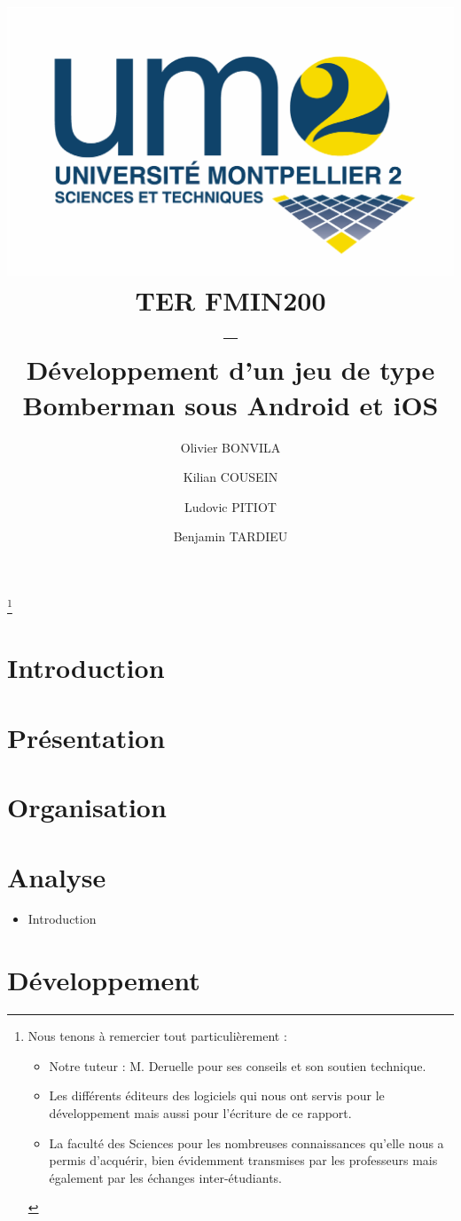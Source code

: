\documentclass[a4paper,11pt]{report}
\title{
	\includegraphics[scale=.2]{logofds.eps}\\
	\vspace*{1cm}
	TER FMIN200 \\ 
	-- \\
	Développement d'un jeu de type Bomberman sous Android et iOS
}
\author{Olivier BONVILA \and Kilian COUSEIN \and Ludovic PITIOT \and Benjamin TARDIEU}
\date{}
\begin{document}
\maketitle

\thanks {
  	Nous tenons à remercier tout particulièrement :
	\begin{itemize}
		\item Notre tuteur : M. Deruelle pour ses conseils et son soutien technique.
		\item Les différents  éditeurs des logiciels qui nous ont servis pour le développement mais aussi pour l’écriture de ce rapport.
		\item La faculté des Sciences pour les nombreuses connaissances qu’elle nous a permis d’acquérir, bien évidemment transmises par les professeurs mais également par les échanges inter-étudiants.
	\end{itemize}
}

\tableofcontents



\chapter{Introduction}

	

\chapter{Présentation}

	
	

\chapter{Organisation}

	
	
	
\chapter{Analyse}
	\begin{itemize}
		\item Introduction
	\end{itemize}
	
	


\chapter{Développement}
\end{document}
